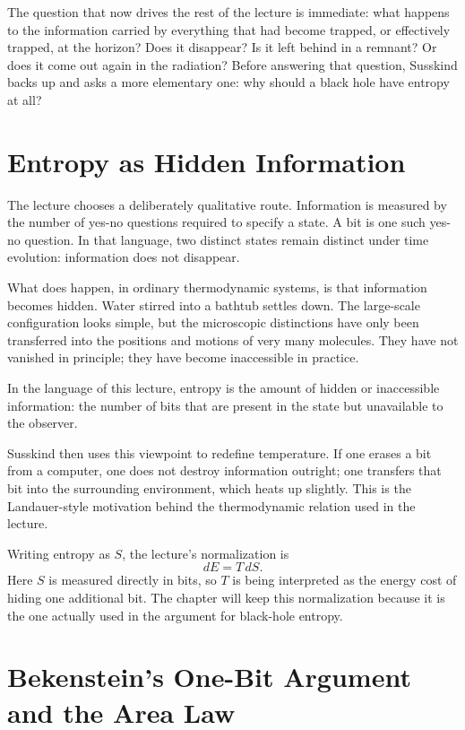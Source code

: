The question that now drives the rest of the lecture is immediate: what happens to the information carried by everything that had become trapped, or effectively trapped, at the horizon? Does it disappear? Is it left behind in a remnant? Or does it come out again in the radiation? Before answering that question, Susskind backs up and asks a more elementary one: why should a black hole have entropy at all?

\section{Entropy as Hidden Information}

The lecture chooses a deliberately qualitative route. Information is measured by the number of yes-no questions required to specify a state. A bit is one such yes-no question. In that language, two distinct states remain distinct under time evolution: information does not disappear.

What does happen, in ordinary thermodynamic systems, is that information becomes hidden. Water stirred into a bathtub settles down. The large-scale configuration looks simple, but the microscopic distinctions have only been transferred into the positions and motions of very many molecules. They have not vanished in principle; they have become inaccessible in practice.

\begin{definition}
In the language of this lecture, entropy is the amount of hidden or inaccessible information: the number of bits that are present in the state but unavailable to the observer.
\end{definition}

Susskind then uses this viewpoint to redefine temperature. If one erases a bit from a computer, one does not destroy information outright; one transfers that bit into the surrounding environment, which heats up slightly. This is the Landauer-style motivation behind the thermodynamic relation used in the lecture.

Writing entropy as \(S\), the lecture's normalization is
\begin{equation}
dE = T\,dS.
\end{equation}
Here \(S\) is measured directly in bits, so \(T\) is being interpreted as the energy cost of hiding one additional bit. The chapter will keep this normalization because it is the one actually used in the argument for black-hole entropy.

\section{Bekenstein's One-Bit Argument and the Area Law}

